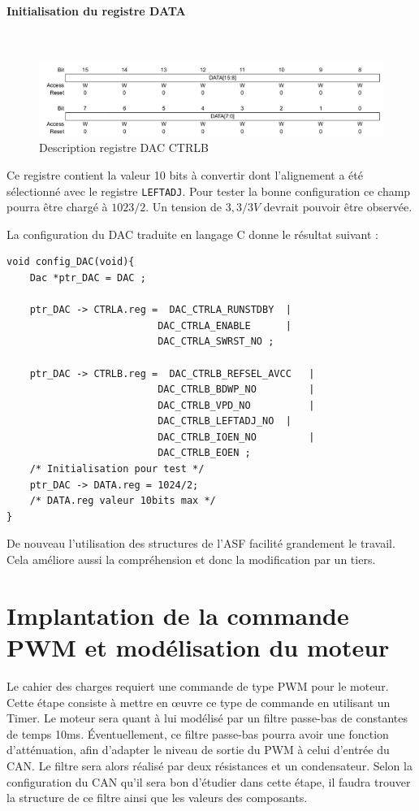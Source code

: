 \documentclass[a4paper]{article}
\begin{document}
\paragraph{Initialisation  du registre DATA} ~~\\
\begin{figure}[H]
	\centering
	\includegraphics[width=12cm]{DATA}
	\caption{Description registre DAC CTRLB}
\end{figure}
Ce registre contient la valeur 10 bits à convertir dont l'alignement a été sélectionné avec le registre \texttt{LEFTADJ}. Pour tester la bonne configuration ce champ pourra être chargé à $1023/2$. Un tension de $3,3/3V$ devrait pouvoir être observée. 

\newpage

La configuration du DAC traduite en langage C donne le résultat suivant :
\begin{lstlisting}[style=CStyle]
void config_DAC(void){
	Dac *ptr_DAC = DAC ;
	
	ptr_DAC -> CTRLA.reg = 	DAC_CTRLA_RUNSTDBY 	|
                          DAC_CTRLA_ENABLE 		|
                          DAC_CTRLA_SWRST_NO ;
	
	ptr_DAC -> CTRLB.reg = 	DAC_CTRLB_REFSEL_AVCC	|
                          DAC_CTRLB_BDWP_NO			|
                          DAC_CTRLB_VPD_NO			|
                          DAC_CTRLB_LEFTADJ_NO  |
                          DAC_CTRLB_IOEN_NO 		|
                          DAC_CTRLB_EOEN ;
	/* Initialisation pour test */
	ptr_DAC -> DATA.reg = 1024/2;
	/* DATA.reg valeur 10bits max */
}
\end{lstlisting}
De nouveau l'utilisation des structures de l'ASF facilité grandement le travail. Cela améliore aussi la compréhension et donc la modification par un tiers.  


\newpage
\section{Implantation de la commande PWM et modélisation du moteur}
	Le cahier des charges requiert une commande de type PWM pour le moteur. Cette étape consiste à mettre en œuvre ce type de commande en utilisant un Timer. Le moteur sera quant à lui modélisé par un filtre passe-bas de constantes de temps 10ms. Éventuellement, ce filtre passe-bas pourra avoir une fonction d’atténuation, afin d’adapter le niveau de sortie du PWM à celui d'entrée du CAN. Le filtre sera alors réalisé par deux résistances et un condensateur. Selon la configuration du CAN qu’il sera bon d’étudier dans cette étape, il faudra trouver la structure de ce filtre ainsi que les valeurs des composants. 
	
\end{document}
